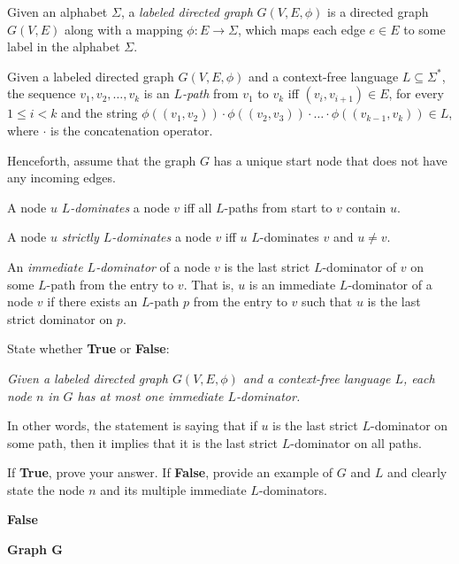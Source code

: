 \documentclass[12pt]{article}
\begin{document}
\begin{enumerate}
      Given an alphabet $\Sigma$, a \emph{labeled directed graph} $G(V, E, \phi)$ is a
      directed graph $G(V, E)$  along with a mapping $\phi \colon E \to \Sigma$,
      which maps each edge $e\in E$ to some label in the alphabet $\Sigma$. 

      Given a labeled directed graph $G(V, E, \phi)$ and a context-free language
      $L \subseteq \Sigma^*$, the sequence $v_1, v_2, \ldots, v_k$ is an
      \emph{$L$-path} from $v_1$ to $v_k$ iff $(v_i,v_{i+1}) \in E$, for every
      $1\leq i < k$ and the string $\phi((v_1, v_2)) \cdot \phi((v_2, v_3)) \cdot \ldots \cdot
      \phi((v_{k-1},v_k)) \in L$, where $\cdot$ is the concatenation operator. 

      Henceforth, assume that the graph $G$ has a unique start node that does
      not have any incoming edges. 

      A node $u$ \emph{$L$-dominates} a node $v$ iff all $L$-paths from start to 
      $v$ contain $u$. 

      A node $u$ \emph{strictly $L$-dominates} a node $v$ iff $u$ $L$-dominates $v$ 
      and $u \neq v$. 

      An \emph{immediate $L$-dominator} of a node $v$ is the last strict
      $L$-dominator of $v$ on some $L$-path from the entry to $v$. That is, $u$
      is an immediate $L$-dominator of a node $v$ if there exists an $L$-path
      $p$ from the entry to $v$ such that $u$ is the last strict dominator on
      $p$.

      State whether \textbf{True} or \textbf{False}: 
    
      \emph{Given a labeled directed graph $G(V,E, \phi)$ and a context-free
      language $L$, each node $n$ in $G$ has at most one immediate $L$-dominator.}

      In other words, the statement is saying that if $u$ is the last strict
      $L$-dominator on some path, then it implies that it is the last strict
      $L$-dominator on all paths. 
    
      If \textbf{True}, prove your answer. If \textbf{False}, provide an example
      of $G$ and $L$ and clearly state the node $n$ and its multiple immediate
      $L$-dominators.
      \begin{mdframed}
      \textbf{False} %

      \textbf{Graph G}

      \begin{tikzpicture}[
          ->,
          vertex/.style={circle, draw, minimum size=1cm},
          node distance=2cm and 2cm
        ]


\end{tikzpicture}
\end{mdframed}
\end{enumerate}
\end{document}
